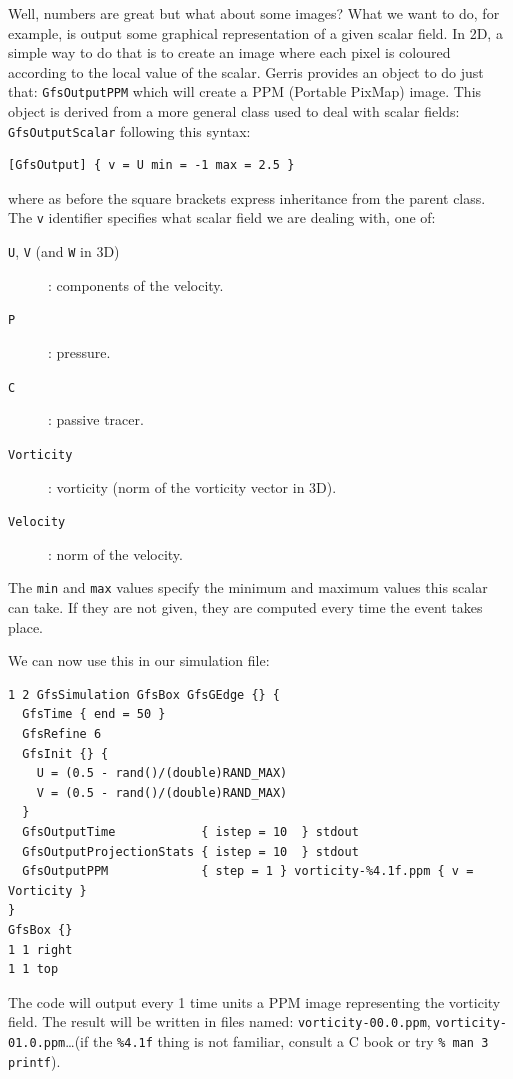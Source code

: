 \documentclass[a4paper]{article}
\begin{document}
Well, numbers are great but what about some images? What we want to 
do, for example, is output some graphical representation of a given
scalar field. In 2D, a simple way to do that is to create an image
where each pixel is coloured according to the local value of the
scalar. Gerris provides an object to do just that: {\tt GfsOutputPPM}
which will create a {\sc PPM} (Portable PixMap) image. This object is
derived from a more general class used to deal with scalar fields:
{\tt GfsOutputScalar} following this syntax:
\begin{verbatim}
[GfsOutput] { v = U min = -1 max = 2.5 }
\end{verbatim}
where as before the square brackets express inheritance from the
parent class. The {\tt v} identifier specifies what scalar field we
are dealing with, one of:
\begin{description}
\item[{\tt U}, {\tt V} (and {\tt W} in 3D)]: components of the velocity.
\item[{\tt P}]: pressure.
\item[{\tt C}]: passive tracer.
\item[{\tt Vorticity}]: vorticity (norm of the vorticity vector in 3D).
\item[{\tt Velocity}]: norm of the velocity.
\end{description}
The {\tt min} and {\tt max} values specify the minimum and maximum
values this scalar can take. If they are not given, they are computed
every time the event takes place.

We can now use this in our simulation file:
\begin{verbatim}
1 2 GfsSimulation GfsBox GfsGEdge {} {
  GfsTime { end = 50 }
  GfsRefine 6
  GfsInit {} {
    U = (0.5 - rand()/(double)RAND_MAX)
    V = (0.5 - rand()/(double)RAND_MAX)
  }  
  GfsOutputTime            { istep = 10  } stdout
  GfsOutputProjectionStats { istep = 10  } stdout
  GfsOutputPPM             { step = 1 } vorticity-%4.1f.ppm { v = Vorticity }
}
GfsBox {}
1 1 right
1 1 top
\end{verbatim}
The code will output every 1 time units a {\sc PPM} image
representing the vorticity field. The result will be written in files 
named: {\tt vorticity-00.0.ppm}, {\tt vorticity-01.0.ppm}\dots (if the 
{\tt \%4.1f} thing is not familiar, consult a C book or try {\tt \% man 
3 printf}).
\end{document}
